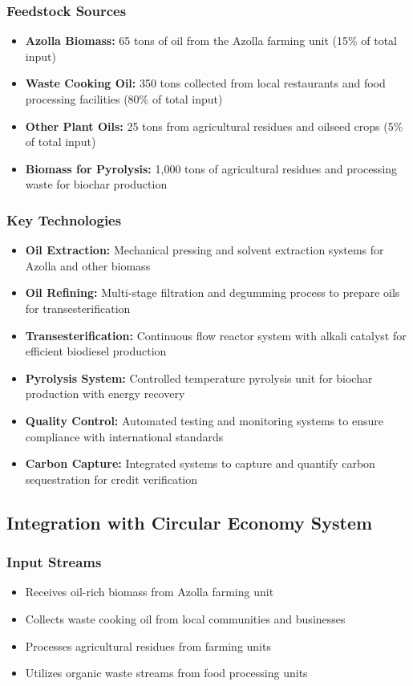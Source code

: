 \subsubsection{Feedstock Sources}
\begin{itemize}
    \item \textbf{Azolla Biomass:} 65 tons of oil from the Azolla farming unit (15\% of total input)
    \item \textbf{Waste Cooking Oil:} 350 tons collected from local restaurants and food processing facilities (80\% of total input)
    \item \textbf{Other Plant Oils:} 25 tons from agricultural residues and oilseed crops (5\% of total input)
    \item \textbf{Biomass for Pyrolysis:} 1,000 tons of agricultural residues and processing waste for biochar production
\end{itemize}

\subsubsection{Key Technologies}
\begin{itemize}
    \item \textbf{Oil Extraction:} Mechanical pressing and solvent extraction systems for Azolla and other biomass
    \item \textbf{Oil Refining:} Multi-stage filtration and degumming process to prepare oils for transesterification
    \item \textbf{Transesterification:} Continuous flow reactor system with alkali catalyst for efficient biodiesel production
    \item \textbf{Pyrolysis System:} Controlled temperature pyrolysis unit for biochar production with energy recovery
    \item \textbf{Quality Control:} Automated testing and monitoring systems to ensure compliance with international standards
    \item \textbf{Carbon Capture:} Integrated systems to capture and quantify carbon sequestration for credit verification
\end{itemize}

\subsection{Integration with Circular Economy System}

\subsubsection{Input Streams}
\begin{itemize}
    \item Receives oil-rich biomass from Azolla farming unit
    \item Collects waste cooking oil from local communities and businesses
    \item Processes agricultural residues from farming units
    \item Utilizes organic waste streams from food processing units
\end{itemize}

